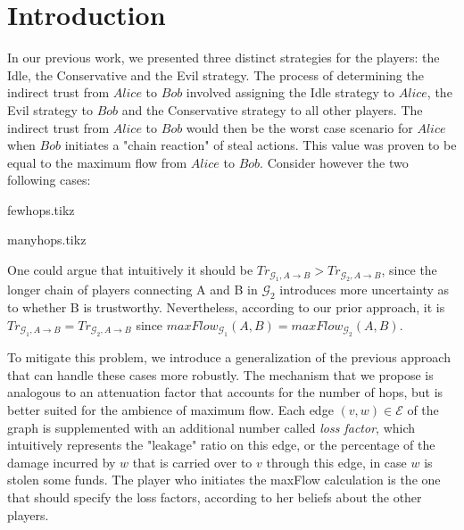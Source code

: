 \section{Introduction}
  In our previous work, we presented three distinct strategies for the players: the Idle, the Conservative and the Evil
  strategy. The process of determining the indirect trust from $Alice$ to $Bob$ involved assigning the Idle strategy to
  $Alice$, the Evil strategy to $Bob$ and the Conservative strategy to all other players. The indirect trust from $Alice$ to
  $Bob$ would then be the worst case scenario for $Alice$ when $Bob$ initiates a "chain reaction" of steal actions. This value
  was proven to be equal to the maximum flow from $Alice$ to $Bob$. Consider however the two following cases:

  {fewhops.tikz}

  {manyhops.tikz}

  One could argue that intuitively it should be $Tr_{\mathcal{G}_1, A \rightarrow B} > Tr_{\mathcal{G}_2, A \rightarrow B}$,
  since the longer chain of players connecting A and B in $\mathcal{G}_2$ introduces more uncertainty as to whether B is
  trustworthy. Nevertheless, according to our prior approach, it is $Tr_{\mathcal{G}_1, A \rightarrow B} = Tr_{\mathcal{G}_2,
  A \rightarrow B}$ since $maxFlow_{\mathcal{G}_1}\left(A, B\right) = maxFlow_{\mathcal{G}_2}\left(A, B\right)$.

  To mitigate this problem, we introduce a generalization of the previous approach that can handle these cases more
  robustly. The mechanism that we propose is analogous to an attenuation factor that accounts for the number of hops, but is
  better suited for the ambience of maximum flow. Each edge $\left(v, w\right) \in \mathcal{E}$ of the graph is supplemented
  with an additional number called \textit{loss factor}, which intuitively represents the "leakage" ratio on this edge, or the
  percentage of the damage incurred by $w$ that is carried over to $v$ through this edge, in case $w$ is stolen some funds.
  The player who initiates the maxFlow calculation is the one that should specify the loss factors, according to her beliefs
  about the other players.
